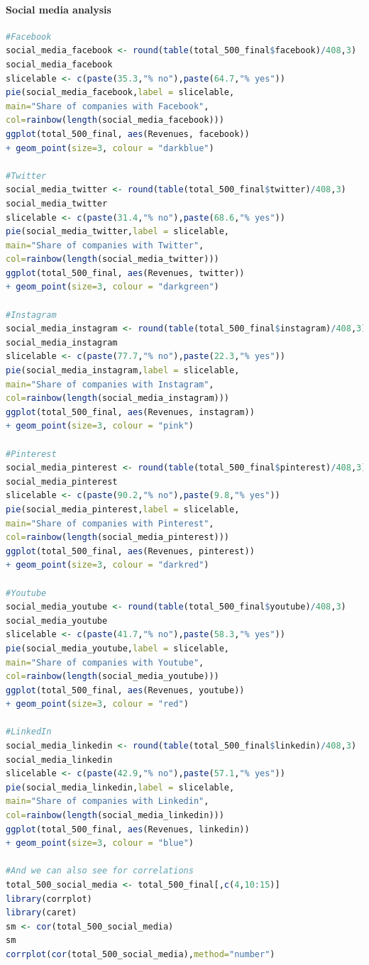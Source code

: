 \documentclass{article}
\begin{document}
\paragraph{Social media analysis}\label{r: van: sm}
\begin{lstlisting}[language=R] 
#Facebook
social_media_facebook <- round(table(total_500_final$facebook)/408,3)
social_media_facebook
slicelable <- c(paste(35.3,"% no"),paste(64.7,"% yes"))
pie(social_media_facebook,label = slicelable,
main="Share of companies with Facebook",
col=rainbow(length(social_media_facebook)))
ggplot(total_500_final, aes(Revenues, facebook)) 
+ geom_point(size=3, colour = "darkblue")

#Twitter
social_media_twitter <- round(table(total_500_final$twitter)/408,3)
social_media_twitter
slicelable <- c(paste(31.4,"% no"),paste(68.6,"% yes"))
pie(social_media_twitter,label = slicelable,
main="Share of companies with Twitter",
col=rainbow(length(social_media_twitter)))
ggplot(total_500_final, aes(Revenues, twitter)) 
+ geom_point(size=3, colour = "darkgreen")

#Instagram
social_media_instagram <- round(table(total_500_final$instagram)/408,3)
social_media_instagram
slicelable <- c(paste(77.7,"% no"),paste(22.3,"% yes"))
pie(social_media_instagram,label = slicelable,
main="Share of companies with Instagram",
col=rainbow(length(social_media_instagram)))
ggplot(total_500_final, aes(Revenues, instagram)) 
+ geom_point(size=3, colour = "pink")

#Pinterest
social_media_pinterest <- round(table(total_500_final$pinterest)/408,3)
social_media_pinterest
slicelable <- c(paste(90.2,"% no"),paste(9.8,"% yes"))
pie(social_media_pinterest,label = slicelable,
main="Share of companies with Pinterest",
col=rainbow(length(social_media_pinterest)))
ggplot(total_500_final, aes(Revenues, pinterest)) 
+ geom_point(size=3, colour = "darkred")

#Youtube
social_media_youtube <- round(table(total_500_final$youtube)/408,3)
social_media_youtube
slicelable <- c(paste(41.7,"% no"),paste(58.3,"% yes"))
pie(social_media_youtube,label = slicelable,
main="Share of companies with Youtube",
col=rainbow(length(social_media_youtube)))
ggplot(total_500_final, aes(Revenues, youtube)) 
+ geom_point(size=3, colour = "red")

#LinkedIn
social_media_linkedin <- round(table(total_500_final$linkedin)/408,3)
social_media_linkedin
slicelable <- c(paste(42.9,"% no"),paste(57.1,"% yes"))
pie(social_media_linkedin,label = slicelable,
main="Share of companies with Linkedin",
col=rainbow(length(social_media_linkedin)))
ggplot(total_500_final, aes(Revenues, linkedin)) 
+ geom_point(size=3, colour = "blue")

#And we can also see for correlations
total_500_social_media <- total_500_final[,c(4,10:15)]
library(corrplot)
library(caret)
sm <- cor(total_500_social_media)
sm
corrplot(cor(total_500_social_media),method="number")
\end{lstlisting}
\end{document}
